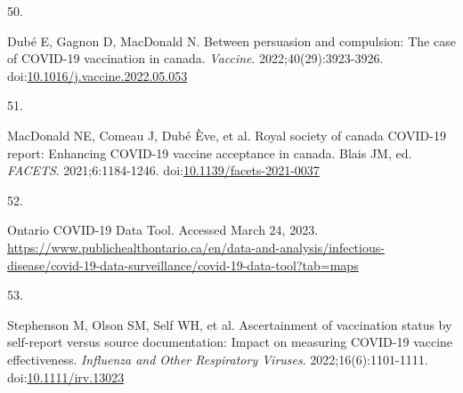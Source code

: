 \documentclass[
  letterpaper,
  DIV=11,
  numbers=noendperiod]{scrartcl}
\newlength{\cslhangindent}
\newlength{\csllabelwidth}
\newlength{\cslentryspacingunit} %
\newenvironment{CSLReferences}[2] %
 {%
  \setlength{\parindent}{0pt}
  \ifodd #1
  \let\oldpar\par
  \def\par{\hangindent=\cslhangindent\oldpar}
  \fi
  \setlength{\parskip}{#2\cslentryspacingunit}
 }%
 {}
\newcommand{\CSLLeftMargin}[1]{\parbox[t]{\csllabelwidth}{#1}}
\newcommand{\CSLRightInline}[1]{\parbox[t]{\linewidth - \csllabelwidth}{#1}\break}
\begin{document}
\begin{CSLReferences}{0}{0}
\leavevmode{}%
\CSLLeftMargin{50. }%
\CSLRightInline{Dubé E, Gagnon D, MacDonald N. Between persuasion and
compulsion: The case of {COVID}-19 vaccination in canada.
\emph{Vaccine}. 2022;40(29):3923-3926.
doi:\href{https://doi.org/10.1016/j.vaccine.2022.05.053}{10.1016/j.vaccine.2022.05.053}}

\leavevmode{}%
\CSLLeftMargin{51. }%
\CSLRightInline{MacDonald NE, Comeau J, Dubé Ève, et al. Royal society
of canada {COVID}-19 report: Enhancing {COVID}-19 vaccine acceptance in
canada. Blais JM, ed. \emph{{FACETS}}. 2021;6:1184-1246.
doi:\href{https://doi.org/10.1139/facets-2021-0037}{10.1139/facets-2021-0037}}

\leavevmode{}%
\CSLLeftMargin{52. }%
\CSLRightInline{{Ontario COVID-19 Data Tool}. Accessed March 24, 2023.
\url{https://www.publichealthontario.ca/en/data-and-analysis/infectious-disease/covid-19-data-surveillance/covid-19-data-tool?tab=maps}}

\leavevmode{}%
\CSLLeftMargin{53. }%
\CSLRightInline{Stephenson M, Olson SM, Self WH, et al. Ascertainment of
vaccination status by self-report versus source documentation: Impact on
measuring {COVID}-19 vaccine effectiveness. \emph{Influenza and Other
Respiratory Viruses}. 2022;16(6):1101-1111.
doi:\href{https://doi.org/10.1111/irv.13023}{10.1111/irv.13023}}

\end{CSLReferences}
\end{document}

